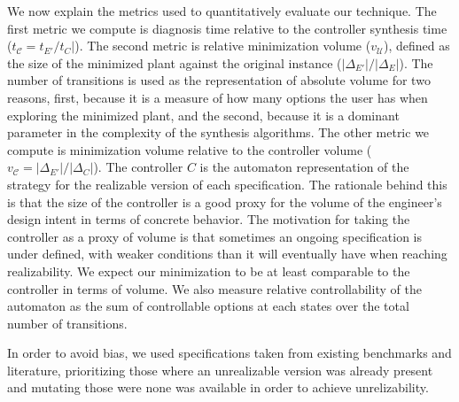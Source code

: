 We now explain the metrics used to quantitatively evaluate our technique. 
The first metric we compute is diagnosis time relative to the controller synthesis time ($t_{\mathcal{C}}=t_{E'}/t_{C}|$). The second metric is relative minimization volume ($v_{\mathcal{U}}$), defined as the size of the minimized plant against the original instance ($|\Delta_{E'}|/|\Delta_{E}|$). 
The number of transitions is used as the representation of absolute volume for two reasons, first, because it is a measure of how many options the user has when exploring the minimized plant, and the  second, because it is a dominant parameter in the complexity of the synthesis algorithms. 
The other metric we compute is minimization volume relative to the controller volume ($v_{\mathcal{C}}=|\Delta_{E'}|/|\Delta_{C}|$). The controller $C$ is the automaton representation of the strategy for the realizable version of each specification. The rationale behind this is that the size of the controller is a good proxy for the volume of the engineer's design intent in terms of concrete behavior. The motivation for taking the controller as a proxy of volume is that sometimes an ongoing specification is under defined, with weaker conditions than it will eventually have when reaching realizability. We expect our minimization to be at least comparable to the controller in terms of volume. We also measure relative controllability of the automaton as the sum of controllable options at each states over the total number of transitions.

In order to avoid bias, we used specifications taken from existing benchmarks and literature, prioritizing those where an unrealizable version was already present and mutating those were none was available in order to achieve unrelizability. 

